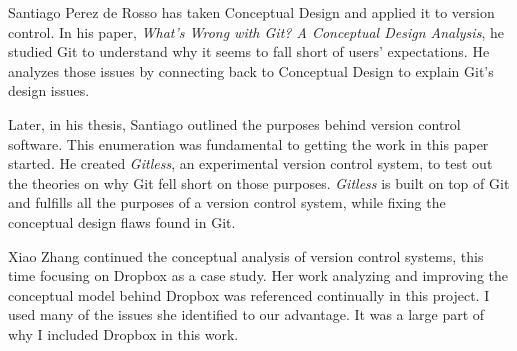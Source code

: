 Santiago Perez de Rosso has taken Conceptual Design and applied it to version control. In his paper, \textit{What's Wrong with Git? A Conceptual Design Analysis}, he studied Git to understand why it seems to fall short of users’ expectations. He analyzes those issues by connecting back to Conceptual Design to explain Git’s design issues. 

Later, in his thesis, Santiago outlined the purposes behind version control software. This enumeration was fundamental to getting the work in this paper started. He created \textit{Gitless}, an experimental version control system, to test out the theories on why Git fell short on those purposes. \textit{Gitless} is built on top of Git and fulfills all the purposes of a version control system, while fixing the conceptual design flaws found in Git. 

Xiao Zhang continued the conceptual analysis of version control systems, this time focusing on Dropbox as a case study. Her work analyzing and improving the conceptual model behind Dropbox was referenced continually in this project. I used many of the issues she identified to our advantage. It was a large part of why I included Dropbox in this work. 

